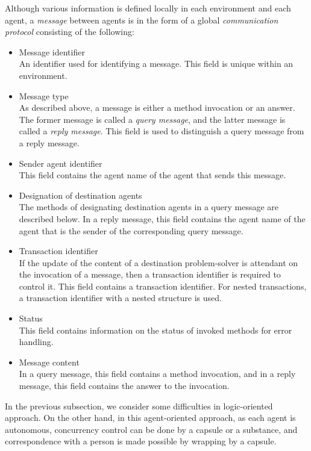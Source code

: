 Although various information is defined locally in each environment
and each agent, a {\em message} between agents is in the form of a
global {\em communication protocol} consisting of the following:

\begin{itemize}\itemsep0mm\parskip0mm
\item Message identifier\\
An identifier used for identifying a message. This field is unique
within an environment.

\item Message type\\
As described above, a message is either a method
invocation or an answer. The former message is called a {\em query
message}, and the latter message is called a {\em reply message}. This
field is used to distinguish a query message from a reply message.

\item Sender agent identifier\\
This field contains the agent name of the agent that sends this
message.

\item Designation of destination agents\\
The methods of designating destination agents in a query message are
described below. In a reply message, this
field contains the agent name of the agent that is the sender of the
corresponding query message.

\item Transaction identifier\\
If the update of the content of a destination problem-solver is
attendant on the invocation of a message, then a transaction
identifier is required to control it.  This field contains a
transaction identifier. For nested transactions, a transaction
identifier with a nested structure is used.

\item Status\\
This field contains information on the status of invoked methods for
error handling.

\item Message content\\
In a query message, this field contains a method invocation, and in a
reply message, this field contains the answer to the invocation.
\end{itemize}

In the previous subsection, we consider some difficulties in logic-oriented
approach.
On the other hand, in this agent-oriented approach, as each agent is
autonomous, concurrency control 
can be done by a capsule or a substance, and correspondence with a person
is made possible by wrapping by a capsule.

